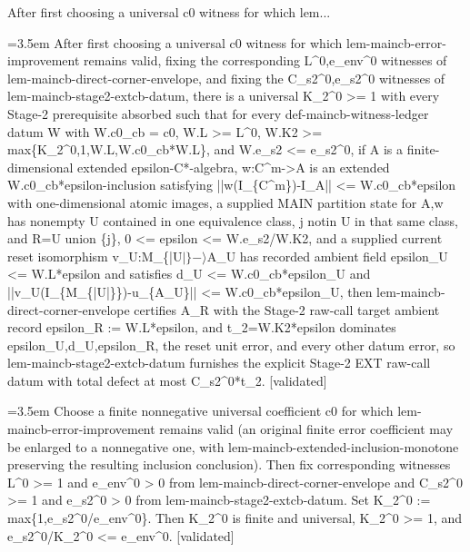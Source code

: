 \documentclass{article}
\newcommand{\step}[1]{\par\noindent\hangindent=3.5em\hangafter=1%
  \makebox[3.5em][l]{\textbf{#1.}}}
\newcommand{\steptag}[1]{\hfill{\small\textsf{[#1]}}}
\begin{document}
\begin{proofbox}{After first choosing a universal c0 witness for which lem...}
\step{1} After first choosing a universal c0 witness for which lem-maincb-error-improvement remains valid, fixing the corresponding L\textasciicircum{}0,e\_env\textasciicircum{}0 witnesses of lem-maincb-direct-corner-envelope, and fixing the C\_s2\textasciicircum{}0,e\_s2\textasciicircum{}0 witnesses of lem-maincb-stage2-extcb-datum, there is a universal K\_2\textasciicircum{}0 >= 1 with every Stage-2 prerequisite absorbed such that for every def-maincb-witness-ledger datum W with W.c0\_cb = c0, W.L >= L\textasciicircum{}0, W.K2 >= max\{K\_2\textasciicircum{}0,1,W.L,W.c0\_cb*W.L\}, and W.e\_s2 <= e\_s2\textasciicircum{}0, if A is a finite-dimensional extended epsilon-C*-algebra, w:C\textasciicircum{}m->A is an extended W.c0\_cb*epsilon-inclusion satisfying ||w(I\_\{C\textasciicircum{}m\})-I\_A|| <= W.c0\_cb*epsilon with one-dimensional atomic images, a supplied MAIN partition state for A,w has nonempty U contained in one equivalence class, j notin U in that same class, and R=U union \{j\}, 0 <= epsilon <= W.e\_s2/W.K2, and a supplied current reset isomorphism v\_U:M\_\{|U$|\}-\rangle$A\_U has recorded ambient field epsilon\_U <= W.L*epsilon and satisfies d\_U <= W.c0\_cb*epsilon\_U and ||v\_U(I\_\{M\_\{|U|\}\})-u\_\{A\_U\}|| <= W.c0\_cb*epsilon\_U, then lem-maincb-direct-corner-envelope certifies A\_R with the Stage-2 raw-call target ambient record epsilon\_R := W.L*epsilon, and t\_2=W.K2*epsilon dominates epsilon\_U,d\_U,epsilon\_R, the reset unit error, and every other datum error, so lem-maincb-stage2-extcb-datum furnishes the explicit Stage-2 EXT raw-call datum with total defect at most C\_s2\textasciicircum{}0*t\_2. \steptag{validated} \\[6pt]
\step{1.1} Choose a finite nonnegative universal coefficient c0 for which lem-maincb-error-improvement remains valid (an original finite error coefficient may be enlarged to a nonnegative one, with lem-maincb-extended-inclusion-monotone preserving the resulting inclusion conclusion). Then fix corresponding witnesses L\textasciicircum{}0 >= 1 and e\_env\textasciicircum{}0 > 0 from lem-maincb-direct-corner-envelope and C\_s2\textasciicircum{}0 >= 1 and e\_s2\textasciicircum{}0 > 0 from lem-maincb-stage2-extcb-datum. Set K\_2\textasciicircum{}0 := max\{1,e\_s2\textasciicircum{}0/e\_env\textasciicircum{}0\}. Then K\_2\textasciicircum{}0 is finite and universal, K\_2\textasciicircum{}0 >= 1, and e\_s2\textasciicircum{}0/K\_2\textasciicircum{}0 <= e\_env\textasciicircum{}0. \steptag{validated} \\[4pt]

\end{proofbox}
\end{document}
